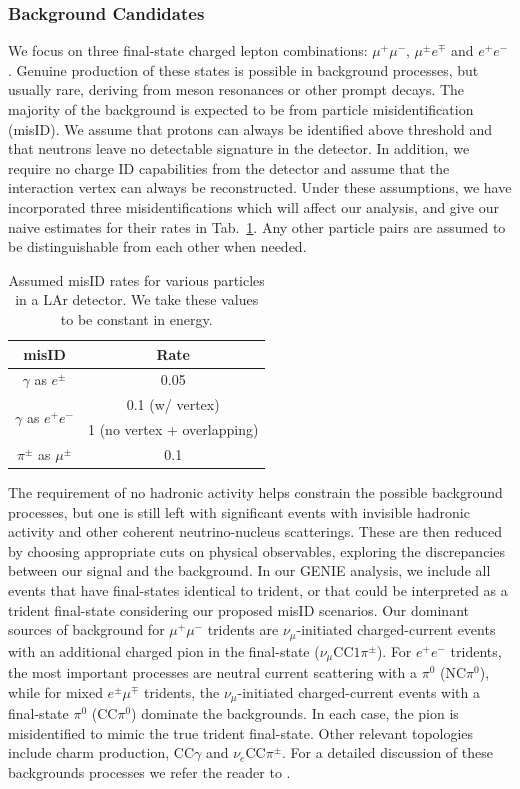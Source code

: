 \subsubsection{Background Candidates}
\label{subsubsec:misID}
We focus on three final-state charged lepton combinations: $\mu^+\mu^-$, $\mu^\pm e^\mp$ and $e^+e^-$. Genuine production of these states is possible in background processes, but usually rare, deriving from meson resonances or other prompt decays. The majority of the background is expected to be from particle misidentification (misID). We assume that protons can always be identified above threshold and that neutrons leave no detectable signature in the detector. In addition, we require no charge ID capabilities from the detector and assume that the interaction vertex can always be reconstructed. Under these assumptions, we have incorporated three misidentifications which will affect our analysis, and give our naive estimates for their rates in Tab.~\ref{tab:misIDlist}. Any other particle pairs are assumed to be distinguishable from each other when needed.
%
\renewcommand{\arraystretch}{1.2}
\begin{table}[t]
\centering 
\begin{tabular}{|c c|}
\hline\hline
\bf misID & \bf Rate \\
\hline\hline
%
$\gamma$ as $e^\pm$ & 0.05 \\
\hline
\multirow{2}{*}{$\gamma$ as $e^+e^-$} & 0.1 (w/ vertex)  \\
 & 1 (no vertex + overlapping)  \\
\hline
$\pi^\pm$ as $\mu^\pm$ & 0.1 \\
\hline\hline
\end{tabular}
\caption{\label{tab:misIDlist} Assumed misID rates for various particles in a LAr detector. We take these values to be constant in energy.}
\end{table}

The requirement of no hadronic activity helps constrain the possible background processes, but one is still left with significant events with invisible hadronic activity and other coherent neutrino-nucleus scatterings. These are then reduced by choosing appropriate cuts on physical observables, exploring the discrepancies between our signal and the background. In our GENIE analysis, we include all events that have final-states identical to trident, or that could be interpreted as a trident final-state considering our proposed misID scenarios. Our dominant sources of background for $\mu^+ \mu^-$ tridents are $\nu_\mu$-initiated charged-current events with an additional charged pion in the final-state ($\nu_\mu$CC$1\pi^\pm$). For $e^+e^-$ tridents, the most important processes are neutral current scattering with a $\pi^0$ (NC$\pi^0$), while for mixed $e^\pm \mu^\mp$ tridents, the $\nu_\mu$-initiated charged-current events with a final-state $\pi^0$ (CC$\pi^0$) dominate the backgrounds. In each case, the pion is misidentified to mimic the true trident final-state. Other relevant topologies include charm production, CC$\gamma$ and $\nu_e$CC$\pi^\pm$. For a detailed discussion of these backgrounds processes we refer the reader to .

